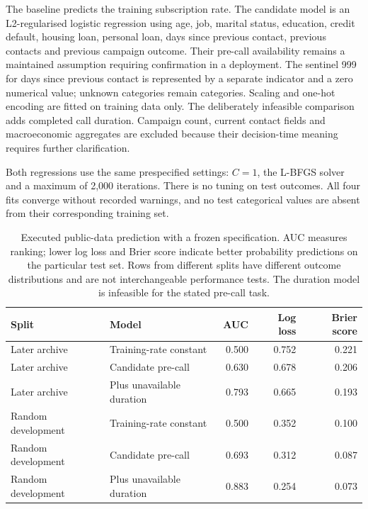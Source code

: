 The baseline predicts the training subscription rate. The candidate model is
an L2-regularised logistic regression using age, job, marital status, education,
credit default, housing loan, personal loan, days since previous contact,
previous contacts and previous campaign outcome. Their pre-call availability
remains a maintained assumption requiring confirmation in a deployment. The
sentinel 999 for days since previous contact is represented by a separate
indicator and a zero numerical value; unknown categories remain categories.
Scaling and one-hot encoding are fitted on training data only. The deliberately
infeasible comparison adds completed call duration. Campaign count, current
contact fields and macroeconomic aggregates are excluded because their
decision-time meaning requires further clarification.

Both regressions use the same prespecified settings: $C=1$, the L-BFGS solver
and a maximum of 2,000 iterations. There is no tuning on test outcomes.
All four fits converge without recorded warnings, and no test categorical
values are absent from their corresponding training set.

\begin{table}[htbp]\centering\small
\begin{tabular}{llrrr}
\toprule
Split & Model & AUC & Log loss & Brier score \\
\midrule
Later archive & Training-rate constant & 0.500 & 0.752 & 0.221 \\
Later archive & Candidate pre-call & 0.630 & 0.678 & 0.206 \\
Later archive & Plus unavailable duration & 0.793 & 0.665 & 0.193 \\
Random development & Training-rate constant & 0.500 & 0.352 & 0.100 \\
Random development & Candidate pre-call & 0.693 & 0.312 & 0.087 \\
Random development & Plus unavailable duration & 0.883 & 0.254 & 0.073 \\
\bottomrule
\end{tabular}
\caption{Executed public-data prediction with a frozen specification. AUC
measures ranking; lower log loss and Brier score indicate better probability
predictions on the particular test set. Rows from different splits have
different outcome distributions and are not interchangeable performance tests.
The duration model is infeasible for the stated pre-call task.}
\label{scisyn:public-timing}
\end{table}

